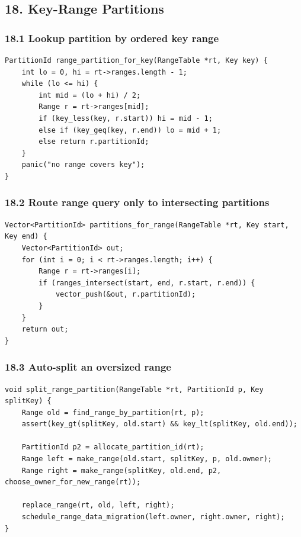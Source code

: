 \documentclass[10pt,letterpaper]{article}
\begin{document}
\subsection*{18. Key-Range Partitions}

\subsubsection*{18.1 Lookup partition by ordered key range}

\begin{verbatim}
PartitionId range_partition_for_key(RangeTable *rt, Key key) {
    int lo = 0, hi = rt->ranges.length - 1;
    while (lo <= hi) {
        int mid = (lo + hi) / 2;
        Range r = rt->ranges[mid];
        if (key_less(key, r.start)) hi = mid - 1;
        else if (key_geq(key, r.end)) lo = mid + 1;
        else return r.partitionId;
    }
    panic("no range covers key");
}
\end{verbatim}

\subsubsection*{18.2 Route range query only to intersecting partitions}

\begin{verbatim}
Vector<PartitionId> partitions_for_range(RangeTable *rt, Key start, Key end) {
    Vector<PartitionId> out;
    for (int i = 0; i < rt->ranges.length; i++) {
        Range r = rt->ranges[i];
        if (ranges_intersect(start, end, r.start, r.end)) {
            vector_push(&out, r.partitionId);
        }
    }
    return out;
}
\end{verbatim}

\subsubsection*{18.3 Auto-split an oversized range}

\begin{verbatim}
void split_range_partition(RangeTable *rt, PartitionId p, Key splitKey) {
    Range old = find_range_by_partition(rt, p);
    assert(key_gt(splitKey, old.start) && key_lt(splitKey, old.end));

    PartitionId p2 = allocate_partition_id(rt);
    Range left = make_range(old.start, splitKey, p, old.owner);
    Range right = make_range(splitKey, old.end, p2, choose_owner_for_new_range(rt));

    replace_range(rt, old, left, right);
    schedule_range_data_migration(left.owner, right.owner, right);
}
\end{verbatim}
\end{document}

